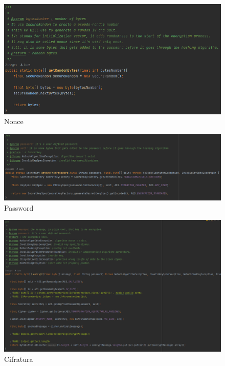 \textsf{\small } %

\begin{figure}[H]
	\centering
	\includegraphics[width=1\textwidth, height=1\textheight, keepaspectratio]{./images/code/java/nonce_getRandomBytes.PNG}
	\caption{Nonce}
	\label{fig:nonce_getRandomBytes}
\end{figure}

\textsf{\small } %

\begin{figure}[H]
	\centering
	\includegraphics[width=1\textwidth, height=1\textheight, keepaspectratio]{./images/code/java/getKeyFromPassword.PNG}
	\caption{Password}
	\label{fig:getKeyFromPassword}
\end{figure}

\textsf{\small } %

\begin{figure}[H]
	\centering
	\includegraphics[width=1\textwidth, height=1\textheight, keepaspectratio]{./images/code/java/encrypt.PNG}
	\caption{Cifratura}
	\label{fig:encrypt_java}
\end{figure}

